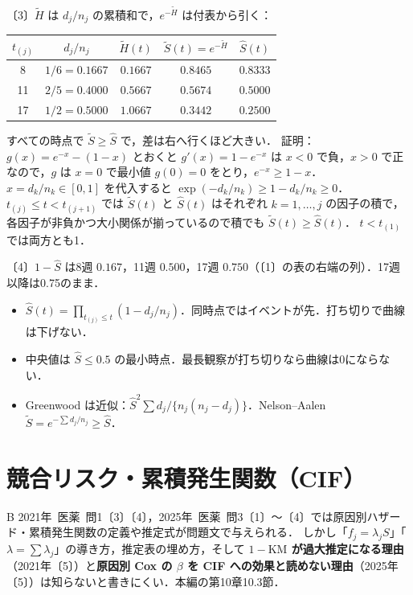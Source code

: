 \documentclass[a4paper,11pt,openany]{ltjsbook}
\newenvironment{kaitou}[1]{%
  \par\medskip\noindent
  \begin{tcolorbox}[enhanced,breakable,colback=bkgray!3,colframe=bkgray!60,boxrule=0.4pt,
    left=4pt,right=4pt,top=2pt,bottom=2pt,arc=1pt,
    title={\cref{#1}の解答},fonttitle=\bfseries\small,coltitle=white,colbacktitle=bkgray!80]}%
  {\end{tcolorbox}\par}
\newcommand{\kakomon}[2]{\mbox{#1年 医薬 問#2}}
\begin{document}
\begin{kaitou}{reidai:m04-1}
〔3〕$\tilde H$ は $d_j/n_j$ の累積和で，$e^{-\tilde H}$ は付表から引く：
\begin{center}\small
\begin{tabular}{@{}ccccc@{}}
\toprule
$t_{(j)}$ & $d_j/n_j$ & $\tilde H(t)$ & $\tilde S(t)=e^{-\tilde H}$ & $\hat S(t)$\\
\midrule
8 & $1/6=0.1667$ & $0.1667$ & $0.8465$ & $0.8333$\\
11 & $2/5=0.4000$ & $0.5667$ & $0.5674$ & $0.5000$\\
17 & $1/2=0.5000$ & $1.0667$ & $0.3442$ & $0.2500$\\
\bottomrule
\end{tabular}
\end{center}
すべての時点で $\tilde S\ge\hat S$ で，差は右へ行くほど大きい．
証明：$g(x)=e^{-x}-(1-x)$ とおくと $g'(x)=1-e^{-x}$ は $x<0$ で負，$x>0$ で正なので，$g$ は $x=0$ で最小値 $g(0)=0$ をとり，$e^{-x}\ge1-x$．
$x=d_k/n_k\in[0,1]$ を代入すると $\exp(-d_k/n_k)\ge1-d_k/n_k\ge0$．
$t_{(j)}\le t<t_{(j+1)}$ では $\tilde S(t)$ と $\hat S(t)$ はそれぞれ $k=1,\dots,j$ の因子の積で，各因子が非負かつ大小関係が揃っているので積でも $\tilde S(t)\ge\hat S(t)$．
$t<t_{(1)}$ では両方とも1．

〔4〕$1-\hat S$ は8週 $0.167$，11週 $0.500$，17週 $0.750$（〔1〕の表の右端の列）．17週以降は0.75のまま．
\end{kaitou}

\begin{summarybox}
\begin{itemize}
\item $\hat S(t)=\prod_{t_{(j)}\le t}(1-d_j/n_j)$．同時点ではイベントが先．打ち切りで曲線は下げない．
\item 中央値は $\hat S\le0.5$ の最小時点．最長観察が打ち切りなら曲線は0にならない．
\item Greenwood は近似：$\hat S^2\sum d_j/\{n_j(n_j-d_j)\}$．Nelson--Aalen $\tilde S=e^{-\sum d_j/n_j}\ge\hat S$．
\end{itemize}
\end{summarybox}

\chapter{競合リスク・累積発生関数（CIF）}\label{ch:m05}

\begin{priobox}{B}
\kakomon{2021}{1}〔3〕〔4〕，\kakomon{2025}{3}〔1〕〜〔4〕では原因別ハザード・累積発生関数の定義や推定式が問題文で与えられる．
しかし「$f_j=\lambda_jS$」「$\lambda=\sum\lambda_j$」の導き方，推定表の埋め方，そして
\textbf{$1-\mathrm{KM}$ が過大推定になる理由}（2021年〔5〕）と\textbf{原因別 Cox の $\beta$ を CIF への効果と読めない理由}（2025年〔5〕）は知らないと書きにくい．本編の第10章10.3節．
\end{priobox}
\end{document}
